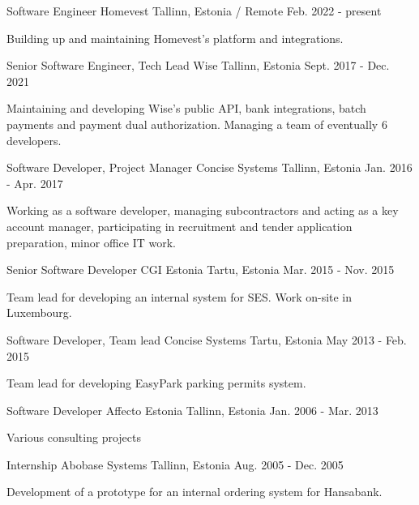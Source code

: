 
\begin{cventries}

  \cventry
      {Software Engineer}
      {Homevest}
      {Tallinn, Estonia / Remote}
      {Feb. 2022 - present}
      {
        \begin{cvitems}
          \item {Building up and maintaining Homevest's platform and integrations.}
        \end{cvitems}
      }

  \cventry
      {Senior Software Engineer, Tech Lead}
      {Wise}
      {Tallinn, Estonia}
      {Sept. 2017 - Dec. 2021}
      {
        \begin{cvitems}
          \item {Maintaining and developing Wise's public API, bank integrations, batch payments and payment dual authorization. Managing a team of eventually 6 developers.}
        \end{cvitems}
      }

  \cventry
    {Software Developer, Project Manager}
    {Concise Systems}
    {Tallinn, Estonia}
    {Jan. 2016 - Apr. 2017}
    {
      \begin{cvitems}
        \item {Working as a software developer, managing subcontractors and acting as a key account manager, participating in recruitment and tender application preparation, minor office IT work.}
      \end{cvitems}
    }

  \cventry
    {Senior Software Developer}
    {CGI Estonia}
    {Tartu, Estonia}
    {Mar. 2015 - Nov. 2015}
    {
      \begin{cvitems}
        \item {Team lead for developing an internal system for SES. Work on-site in Luxembourg.}
      \end{cvitems}
    }

  \cventry
    {Software Developer, Team lead}
    {Concise Systems}
    {Tartu, Estonia}
    {May 2013 - Feb. 2015}
    {
      \begin{cvitems}
        \item {Team lead for developing EasyPark parking permits system.}
      \end{cvitems}
    }

  \cventry
    {Software Developer}
    {Affecto Estonia}
    {Tallinn, Estonia}
    {Jan. 2006 - Mar. 2013}
    {
      \begin{cvitems}
        \item {Various consulting projects}
      \end{cvitems}
    }

  \cventry
    {Internship}
    {Abobase Systems}
    {Tallinn, Estonia}
    {Aug. 2005 - Dec. 2005}
    {
      \begin{cvitems}
        \item {Development of a prototype for an internal ordering system for Hansabank.}
      \end{cvitems}
    }

\end{cventries}
